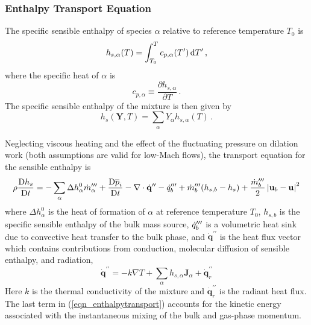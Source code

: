 \documentclass[11pt]{book}
\begin{document}
\subsubsection{Enthalpy Transport Equation}
\label{enthalpy_definitions}

The specific sensible enthalpy of species $\alpha$ relative to reference temperature $T_0$ is
\begin{equation}
\label{eqn_sensible}
h_{s,\alpha}(T) = \int_{T_0}^{T} c_{p,\alpha}(T^\prime) \,\mathrm{d} T^\prime \,\mbox{,}
\end{equation}
where the specific heat of $\alpha$ is
\begin{equation}
\label{eqn_specificheat}
c_{p,\alpha} \equiv \frac{\partial h_{s,\alpha}}{\partial T} \,\mbox{.}
\end{equation}
The specific sensible enthalpy of the mixture is then given by
\begin{equation}
\label{eqn_chemsensmix}
h_s(\mathbf{Y},T) = \sum_\alpha Y_\alpha h_{s,\alpha}(T) \,\mbox{.}
\end{equation}

Neglecting viscous heating and the effect of the fluctuating pressure on dilation work (both assumptions are valid for low-Mach flows), the transport equation for the sensible enthalpy is
\begin{equation}
\label{eqn_enthalpytransport}
\rho \frac{\mbox{D} h_s }{\mbox{D} t} = -\sum_\alpha \Delta h^0_\alpha \dot{m}_{\alpha}^{{\prime\prime\prime}} + \frac{\mbox{D} \overline{p}_i }{\mbox{D} t} - \nabla\cdot \dot{\mathbf{q}}^{\prime\prime} - \dot{q}_b''' + \dot{m}_{b}^{{\prime\prime\prime}} ( h_{s,b} - h_s ) + \frac{\dot{m}_{b}^{{\prime\prime\prime}}}{2}\left|\mathbf{u}_b-\mathbf{u}\right|^2
\end{equation}
where $\Delta h^0_\alpha$ is the heat of formation of $\alpha$ at reference temperature $T_0$, $h_{s,b}$ is the specific sensible enthalpy of the bulk mass source, $\dot{q}_b^{{\prime\prime\prime}}$ is a volumetric heat sink due to convective heat transfer to the bulk phase, and $\dot{\mathbf{q}}^{\prime\prime}$ is the heat flux vector which contains contributions from conduction, molecular diffusion of sensible enthalpy, and radiation,
\begin{equation}
\label{eqn_heatflux}
\dot{\mathbf{q}}^{\prime\prime} = -k \nabla T + \sum_\alpha h_{s,\alpha} \mathbf{J}_{\alpha} + \dot{\mathbf{q}}^{\prime\prime}_{r}
\end{equation}
Here $k$ is the thermal conductivity of the mixture and $\dot{\mathbf{q}}^{\prime\prime}_{r}$ is the radiant heat flux.  The last term in (\ref{eqn_enthalpytransport}) accounts for the kinetic energy associated with the instantaneous mixing of the bulk and gas-phase momentum.
\end{document}
